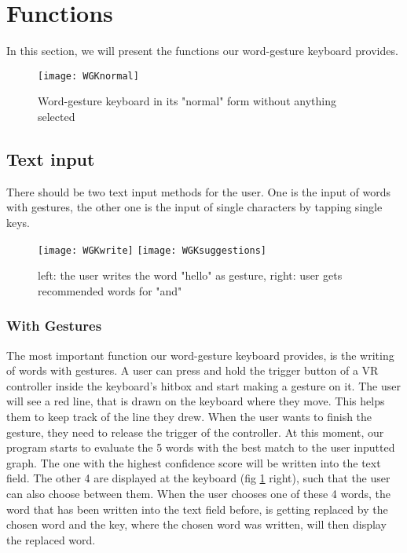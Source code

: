 \section{Functions}
In this section, we will present the functions our word-gesture keyboard provides.
\begin{figure}
\centering
\texttt{[image: WGKnormal]}
\caption{Word-gesture keyboard in its "normal" form without anything selected}
\end{figure}
    
\subsection{Text input}
There should be two text input methods for the user. One is the input of words with gestures, the other one is the input of single characters by tapping single keys.

\begin{figure}
\centering
\texttt{[image: WGKwrite]}
\texttt{[image: WGKsuggestions]}
\caption{left: the user writes the word "hello" as gesture, right: user gets recommended words for "and"}
\label{fig:write_suggestions}
\end{figure}

\subsubsection{With Gestures}
The most important function our word-gesture keyboard provides, is the writing of words with gestures. A user can press and hold the trigger button of a VR controller inside the keyboard's hitbox and start making a gesture on it. The user will see a red line, that is drawn on the keyboard where they move. This helps them to keep track of the line they drew. When the user wants to finish the gesture, they need to release the trigger of the controller. At this moment, our program starts to evaluate the 5 words with the best match to the user inputted graph. The one with the highest confidence score will be written into the text field. The other 4 are displayed at the keyboard (fig \ref{fig:write_suggestions} right), such that the user can also choose between them. When the user chooses one of these 4 words, the word that has been written into the text field before, is getting replaced by the chosen word and the key, where the chosen word was written, will then display the replaced word.
